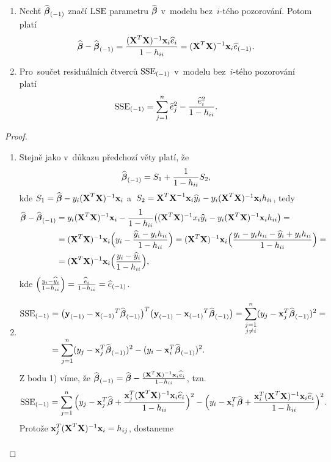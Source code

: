\begin{theorem}
	\begin{enumerate}[1)]
		\item Nechť ${\widehat{\boldsymbol{\beta}}_{(-1)}}$ značí $\mathrm{LSE}$ parametru $\widehat{\boldsymbol{\beta}}$ v~modelu bez~$i$-tého pozorování. Potom platí 
	$$ \widehat{\boldsymbol{\beta}}-{\widehat{\boldsymbol{\beta}}_{(-1)}}=\frac{(\textbf{X}^T\textbf{X})^{-1}\textbf{x}_i\widehat{e}_i}{1-h_{ii}}=(\textbf{X}^T\textbf{X})^{-1}\textbf{x}_i{\widehat{e}_{(-1)}}.$$
	\item Pro~součet residuálních čtverců ${\mathrm{SSE}_{(-1)}}$ v~modelu bez~$i$-tého pozorování platí
	$${\mathrm{SSE}_{(-1)}}=\sum\limits_{j=1}^{n} \widehat{e}_j^2-\frac{\widehat{e}_i^2}{1-h_{ii}}.$$
	\end{enumerate}
\begin{proof}
	\begin{enumerate}[1)]
		\item Stejně jako v~důkazu předchozí věty platí, že 
		$$ {\widehat{\boldsymbol{\beta}}_{(-1)}}=S_1+\frac{1}{1-h_{ii}}S_2,$$
		kde $S_1=\widehat{\boldsymbol{\beta}}-y_i(\textbf{X}^T\textbf{X})^{-1}\textbf{x}_i$ a~$S_2=\textbf{X}^T\textbf{X}^{-1}\textbf{x}_i\widehat{y}_i-y_i(\textbf{X}^T\textbf{X})^{-1} \textbf{x}_ih_{ii}$, tedy
		\[
		\begin{split}
		\widehat{\boldsymbol{\beta}}-{\widehat{\boldsymbol{\beta}}_{(-1)}}&=y_i(\textbf{X}^T\textbf{X})^{-1}\textbf{x}_i-\frac{1}{1-h_{ii}}\big((\textbf{X}^T\textbf{X})^{-1} x_i\widehat{y}_i-y_i(\textbf{X}^T\textbf{X})^{-1} \textbf{x}_ih_{ii}\big)=\\&=(\textbf{X}^T\textbf{X})^{-1} \textbf{x}_i\Big(y_i-\frac{\widehat{y}_i-y_ih_{ii}}{1-h_{ii}}\Big)=(\textbf{X}^T\textbf{X})^{-1} \textbf{x}_i\Big(\frac{y_i-y_ih_{ii}-\widehat{y}_i+y_ih_{ii}}{1-h_{ii}}\Big)=\\&=(\textbf{X}^T\textbf{X})^{-1} \textbf{x}_i\Big(\frac{y_i-\widehat{y}_i}{1-h_{ii}}\Big),
		\end{split}
		\] 
		kde $\Big(\frac{y_i-\widehat{y}_i}{1-h_{ii}}\Big)=\frac{\widehat{e}_i}{1-h_{ii}}={\widehat{e}_{(-1)}}$.
		\item \[
		\begin{split}
		{\mathrm{SSE}_{(-1)}}&=\big({\textbf{y}_{(-1)}}-{\textbf{x}_{(-1)}}^T{\widehat{\boldsymbol{\beta}}_{(-1)}}\big)^T\big({\textbf{y}_{(-1)}}-{\textbf{x}_{(-1)}}^T{\widehat{\boldsymbol{\beta}}_{(-1)}}\big)=\sum_{\substack{j=1\\j\neq i}}^{n}(y_j-\textbf{x}_j^T{\widehat{\boldsymbol{\beta}}_{(-1)}})^2=\\&=\sum\limits_{j=1}^{n} (y_j-\textbf{x}_j^T{\widehat{\boldsymbol{\beta}}_{(-1)}})^2-(y_i-\textbf{x}_i^T{\widehat{\boldsymbol{\beta}}_{(-1)}})^2.
		\end{split}
		\]
		Z bodu 1) víme, že ${\widehat{\boldsymbol{\beta}}_{(-1)}}=\widehat{\boldsymbol{\beta}}-\frac{(\textbf{X}^T\textbf{X})^{-1} \textbf{x}_i\widehat{e}_i}{1-h_{ii}}$, tzn.
		$$ {\mathrm{SSE}_{(-1)}}=\sum\limits_{j=1}^{n}\Big(y_j-\textbf{x}_j^T\widehat{\boldsymbol{\beta}}+\frac{\textbf{x}_j^T(\textbf{X}^T\textbf{X})^{-1} \textbf{x}_i\widehat{e}_i}{1-h_{ii}}\Big)^2-\Big(y_i-\textbf{x}_i^T\widehat{\boldsymbol{\beta}}+\frac{\textbf{x}_i^T(\textbf{X}^T\textbf{X})^{-1} \textbf{x}_i\widehat{e}_i}{1-h_{ii}}\Big)^2.$$
		Protože $\textbf{x}_j^T(\textbf{X}^T\textbf{X})^{-1} \textbf{x}_i=h_{ij}$, dostaneme
		\[
	\begin{split}

\end{split}\]
\end{enumerate}
\end{proof}
\end{theorem}
